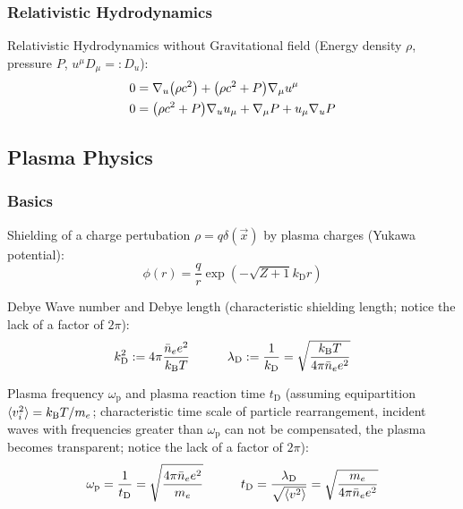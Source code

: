		\subsubsection{Relativistic Hydrodynamics}
			Relativistic Hydrodynamics without Gravitational field (Energy density $\rho$, pressure $P$, $u^\mu D_\mu =: D_u$):
			\begin{equation}
				\begin{aligned}
					0 &= \nabla_u \qty(\rho c^2) + \qty(\rho c^2 + P) \nabla_\mu u^\mu \\
					0 &= \qty(\rho c^2 + P) \nabla_u u_\mu + \nabla_\mu P + u_\mu \nabla_u P \\
				\end{aligned}
			\end{equation}

	\subsection{Plasma Physics}
		\subsubsection{Basics}
			Shielding of a charge pertubation $\rho=q\delta(\vec{x})$ by plasma charges (Yukawa potential):
			\begin{equation}
				\phi(r) = \frac{q}{r} \exp(-\sqrt{Z+1}k_\text{D} r)
			\end{equation}

			\noindent
			Debye Wave number and Debye length (characteristic shielding length; notice the lack of a factor of $2\pi$):
			\begin{equation}
				k_\text{D}^2 := 4\pi \frac{\bar{n}_e e^2}{k_{\text{B}} T} \hspace{30pt} 
				\lambda_\text{D} := \frac{1}{k_\text{D}} = \sqrt{\frac{k_{\text{B}} T}{4\pi \bar{n}_e e^2}}
			\end{equation}

			\noindent
			Plasma frequency $\omega_\text{p}$ and plasma reaction time $t_\text{D}$ (assuming equipartition $\langle v_i^2 \rangle = k_{\text{B}} T / m_e$; characteristic time scale of particle rearrangement, incident waves with frequencies greater than $\omega_\text{p}$ can not be compensated, the plasma becomes transparent; notice the lack of a factor of $2\pi$):
			\begin{equation}
				\omega_\text{p} = \frac{1}{t_\text{D}} = \sqrt{\frac{4\pi\bar{n}_e e^2}{m_e}} \hspace{30pt}
				t_\text{D} = \frac{\lambda_\text{D}}{\sqrt{\langle v^2 \rangle}} = \sqrt{\frac{m_e}{4\pi \bar{n}_e e^2}} 
			\end{equation}


